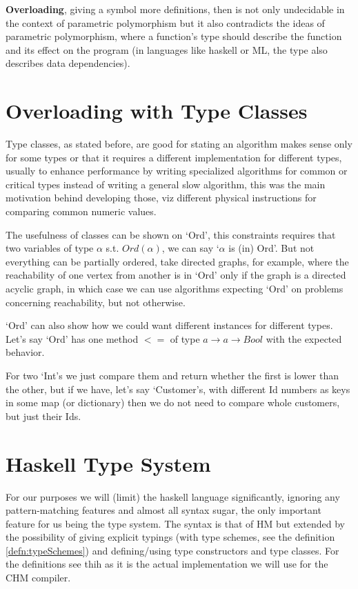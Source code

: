 \textbf{Overloading}, giving a symbol more definitions, then is not only undecidable in the context of parametric polymorphism but it also contradicts the ideas of parametric polymorphism, where a function's type should describe the function and its effect on the program (in languages like haskell or ML, the type also describes data dependencies).

\section{Overloading with Type Classes}

Type classes, as stated before, are good for stating an algorithm makes sense only for some types or that it requires a different implementation for different types, usually to enhance performance by writing specialized algorithms for common or critical types instead of writing a general slow algorithm, this was the main motivation behind developing those, %
viz different physical instructions for comparing common numeric values.

The usefulness of classes can be shown on `Ord', this constraints requires that two variables of type $\alpha$ s.t. $Ord(\alpha)$, we can say `$\alpha$ is (in) Ord'. But not everything can be partially ordered, take directed graphs, for example, where the reachability of one vertex from another is in `Ord' only if the graph is a directed acyclic graph, in which case we can use algorithms expecting `Ord' on problems concerning reachability, but not otherwise.

`Ord' can also show how we could want different instances for different types. Let's say `Ord' has one method $<=$ of type $a \rightarrow a \rightarrow Bool$ with the expected behavior.

For two `Int's we just compare them and return whether the first is lower than the other, but if we have, let's say `Customer's, with different Id numbers as keys in some map (or dictionary) then we do not need to compare whole customers, but just their Ids.

\section{Haskell Type System}

For our purposes we will (limit) the haskell language significantly, ignoring any pattern-matching features and almost all syntax sugar, the only important feature for us being the type system. The syntax is that of HM but extended by the possibility of giving explicit typings (with type schemes, see the definition \ref{defn:typeSchemes}) and defining/using type constructors and type classes. For the  definitions see thih \cite{jones1999typing} as it is the actual implementation we will use for the CHM compiler.

